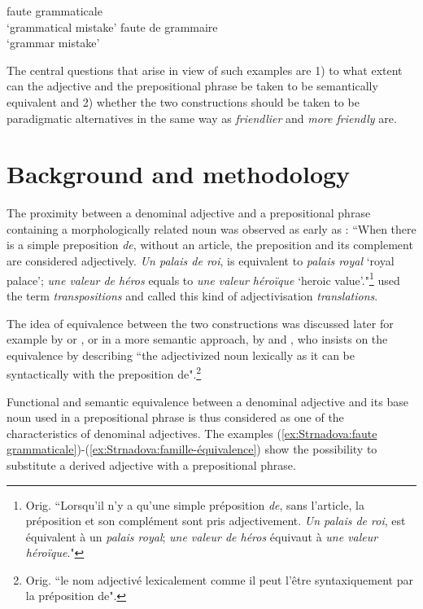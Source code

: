 \documentclass[output=paper]{LSP/langsci}
\begin{document}
\begin{exe}
\ex \label{ex:Strnadova:faute grammaticale} \begin{xlist}
	\ex \label{ex:Strnadova:grammaticale} {faute grammaticale}\\ `grammatical mistake'
	\ex \label{ex:Strnadova:grammaire} {faute de grammaire}\\ `grammar mistake'
	\end{xlist}
\end{exe}

The central questions that arise in view of such examples are 1) to what extent can the adjective and the prepositional phrase be taken to be semantically equivalent and 2) whether the two constructions should be taken to be paradigmatic alternatives in the same way as \emph{friendlier} and \emph{more friendly} are.


\section{Background and methodology}

The proximity between a denominal adjective and a prepositional phrase containing a morphologically related noun was observed as early as \citet[413]{dumarsais}: ``When there is a simple preposition \emph{de}, without an article, the preposition and its complement are considered adjectively. \emph{Un palais de roi}, is equivalent to \emph{palais royal} `royal palace'; \emph{une valeur de héros} equals to \emph{une valeur héroïque} `heroic value'."\footnote{Orig. ``Lorsqu'il n'y a qu'une simple préposition \emph{de}, sans l'article, la préposition et son complément sont pris adjectivement. \emph{Un palais de roi}, est équivalent à un \emph{palais  royal}; \emph{une valeur de héros} équivaut à \emph{une valeur héroïque}."} \citet{bally} used the term \emph{transpositions} and \citet{tesniere} called this kind of adjectivisation \emph{translations}.

The idea of equivalence between the two constructions was discussed later for example by \citet{bosredon1988} or  \citet{bartnoailly1993},  or in a more semantic approach, by \citet{nowakowska2004} and \citet[380]{roche2006adj}, who insists on the equivalence by describing ``the adjectivized noun lexically as it can be syntactically with the preposition de".\footnote{Orig. ``le nom adjectivé lexicalement comme il peut l'être syntaxiquement par la préposition de".}

Functional and semantic equivalence between a denominal adjective and its base noun used in a prepositional phrase is thus considered as one of the characteristics of denominal adjectives. The examples (\ref{ex:Strnadova:faute grammaticale})-(\ref{ex:Strnadova:famille-équivalence}) show the possibility to substitute a derived adjective with a prepositional phrase.
\end{document}
